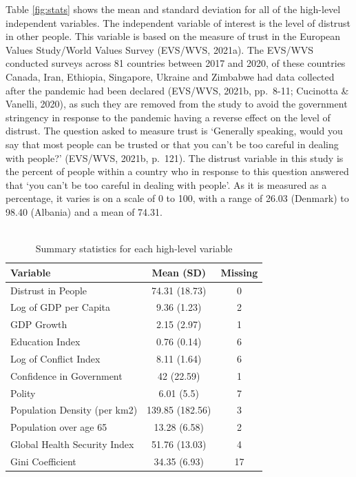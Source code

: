 \documentclass[
  11pt,
]{article}
\begin{document}
Table \ref{fig:stats} shows the mean and standard deviation for all of the high-level independent variables. The independent variable of interest is the level of distrust in other people. This variable is based on the measure of trust in the European Values Study/World Values Survey (EVS/WVS, 2021a). The EVS/WVS conducted surveys across 81 countries between 2017 and 2020, of these countries Canada, Iran, Ethiopia, Singapore, Ukraine and Zimbabwe had data collected after the pandemic had been declared (EVS/WVS, 2021b, pp.~8-11; Cucinotta \& Vanelli, 2020), as such they are removed from the study to avoid the government stringency in response to the pandemic having a reverse effect on the level of distrust. The question asked to measure trust is `Generally speaking, would you say that most people can be trusted or that you can't be too careful in dealing with people?' (EVS/WVS, 2021b, p.~121). The distrust variable in this study is the percent of people within a country who in response to this question answered that `you can't be too careful in dealing with people'. As it is measured as a percentage, it varies is on a scale of 0 to 100, with a range of 26.03 (Denmark) to 98.40 (Albania) and a mean of 74.31.\\
~\\

\begin{table}

\caption{\label{tab:stats}Summary statistics for each high-level variable}
\centering
\begin{tabular}[t]{lcc}
\toprule
Variable & Mean (SD) & Missing\\
\midrule
Distrust in People & 74.31 (18.73) & 0\\
Log of GDP per Capita & 9.36 (1.23) & 2\\
GDP Growth & 2.15 (2.97) & 1\\
Education Index & 0.76 (0.14) & 6\\
Log of Conflict Index & 8.11 (1.64) & 6\\
\addlinespace
Confidence in Government & 42 (22.59) & 1\\
Polity & 6.01 (5.5) & 7\\
Population Density (per km2) & 139.85 (182.56) & 3\\
Population over age 65 & 13.28 (6.58) & 2\\
Global Health Security Index & 51.76 (13.03) & 4\\
\addlinespace
Gini Coefficient & 34.35 (6.93) & 17\\
\bottomrule
\end{tabular}
\end{table}
\end{document}

